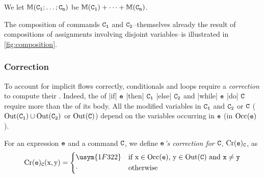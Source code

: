 \documentclass[conference]{IEEEtran}
\newcommand{\vi}{\usym{1F322}} %
\newcommand{\nv}{\cdot} %
\begin{document}
\begin{definition}[Composition]
	We let	$\mathbb{M}(\mathtt{\mathtt{C_{1}};\dots;\mathtt{C_{n}}})$
	be %
	$\mathbb{M}(\mathtt{C_{1}}) + \cdots + \mathbb{M}(\mathtt{C_{n}})$.
\end{definition}

The composition of commands $\mathtt{C_1}$ and $\mathtt{C_2}$--themselves already the result of compositions of assignments involving disjoint variables--is illustrated in \autoref{fig:composition}.

\subsubsection{Correction}

To account for implicit flows correctly, conditionals and loops require a \emph{correction} to compute their \SFMs.
Indeed, the \SFMs of \prc|if| \(\mathtt{e}\) \prc|then| \(\mathtt{C_{1}}\) \prc|else| \(\mathtt{C_{2}}\) and \prc|while| $\mathtt{e}$ \prc|do| $\mathtt{C}$ require more than the \SFM of its body.
All the modified variables in \(\mathtt{C_1}\) and \(\mathtt{C_2}\) or \(\mathtt{C}\) (\eg \(\operatorname{Out}(\mathtt{C_1}) \cup \operatorname{Out}(\mathtt{C_2})\) or \(\operatorname{Out}(\mathtt{C})\)) depend on the variables occurring in \(\mathtt{e}\) (\eg  in \(\operatorname{Occ}(\mathtt{e})\)).

\begin{definition}[Correction]
	For an expression $\mathtt{e}$ and a command \(\mathtt{C}\), we define \emph{$\mathtt{e}$'s correction for $\mathtt{C}$}, $\mathrm{Cr}(\mathtt{e})_{\mathtt{C}}$, as
	\[
	\corr{\comm{e}}_{\comm{C}}(\textnormal{\prc|x|},\textnormal{\prc|y|})=
	\begin{dcases*}
		\vi &  if $\textnormal{\prc|x|} \in \Occ(\comm{e})$, $\textnormal{\prc|y|} \in \Out(\comm{C})$ and \(\comm{x} \neq \comm{y}\)\\
		\nv & otherwise
	\end{dcases*}
	\]
\end{definition}
%
\end{document}
